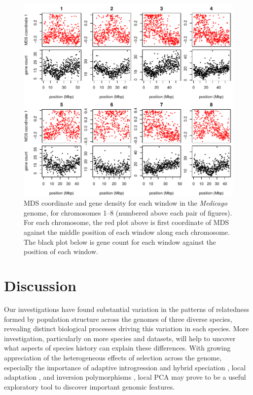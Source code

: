 \documentclass[11pt, oneside]{article}   	%
\begin{document}
\begin{figure}
    \begin{center}
       \includegraphics{Fig5_MDS_and_gene_count_allchr_update_correction}
    \end{center}
    \caption{
         MDS coordinate and gene density for each window in the \textit{Medicago} genome,
         for chromosomes 1--8 (numbered above each pair of figures).
         For each chromosome, the red plot above is first coordinate of MDS against the middle position of each window along each chromosome. 
         The black plot below is gene count for each window against the position of each window.
         \label{fig:mds_medicago}
    }
\end{figure}

\section{Discussion}

Our investigations have found substantial variation in the patterns of relatedness formed by population structure across the genomes
of three diverse species,
revealing distinct biological processes driving this variation in each species.
More investigation, particularly on more species and datasets, will help to uncover what aspects of species history can explain these differences.
With growing appreciation of the heterogeneous effects of selection across the genome,
especially the importance of adaptive introgression and hybrid speciation \citep{pool2015natural,brandvain2014speciation,hufford2013genomic,fitzpatrick2010rapid,staubach2012genome},
local adaptation \citep{lenormand2002limits,wang2014isolation},
and inversion polymorphisms \citep{kirkpatrick2015chromosome,kirkpatrick2010chromosome},
local PCA may prove to be a useful exploratory tool to discover important genomic features.
\end{document}
